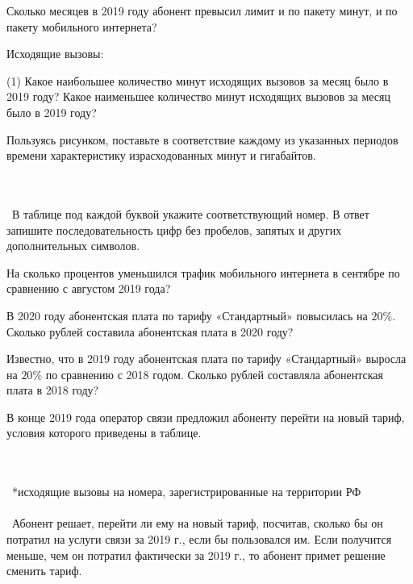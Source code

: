 \begin{class}[number=7]
\begin{listofex}
		
		\item Сколько месяцев в 2019 году абонент превысил лимит и по пакету минут, и по пакету мобильного интернета?
		\item Исходящие вызовы:
		\begin{tasks}(1)
			\task[A)]  Какое наибольшее количество минут исходящих вызовов за месяц было в 2019 году?
			\task[Б)] Какое наименьшее количество минут исходящих вызовов за месяц было в 2019 году? 
		\end{tasks}
		\item Пользуясь рисунком, поставьте в соответствие каждому из указанных периодов времени характеристику израсходованных минут и гигабайтов.
	\\\	\begin{figure}[h]
		\end{figure}\\\
		В таблице под каждой буквой укажите соответствующий номер. В ответ запишите последовательность цифр без пробелов, запятых и других дополнительных символов.
		 \item На сколько процентов уменьшился трафик мобильного интернета в сентябре по сравнению с августом 2019 года?		 
		 \item В 2020 году абонентская плата по тарифу «Стандартный» повысилась
		 на \( 20\% \). Сколько рублей составила абонентская плата в 2020 году?
		 \item Известно, что в 2019 году абонентская плата по тарифу «Стандартный» выросла на \( 20\% \) по сравнению с 2018 годом. Сколько рублей составляла абонентская плата в 2018 году? 
		 \item В конце 2019 года оператор связи предложил абоненту перейти на новый тариф, условия которого приведены в таблице.\\\
		 \begin{figure}[h]
		 \end{figure}
	 	\\\ *исходящие вызовы на номера, зарегистрированные на территории РФ
	 	\\\ 
	 	\\\ Абонент решает, перейти ли ему на новый тариф, посчитав, сколько бы он потратил на услуги связи за 2019 г., если бы пользовался им. Если получится меньше, чем он потратил фактически за 2019 г., то абонент примет решение сменить тариф. 

\end{listofex}
\end{class}
